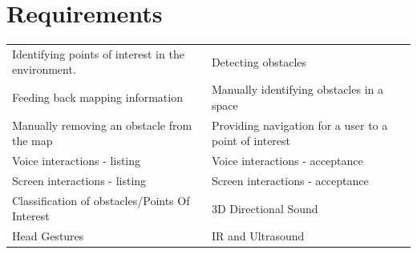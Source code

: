 \documentclass[prodmode,acmtosem]{acmsmall} %
\begin{document}
\section{Requirements}
\begin{center}
\begin{tabularx}{\textwidth}{| X | X |} 
 \hline
 \rowcolor{lightgray}
 \multicolumn{2}{|c|}{List of Requirements} \\ [0.5ex] 
 \hline\hline
 Identifying points of interest in the environment. &  Detecting obstacles \\
 \hline
 Feeding back mapping information &  Manually identifying obstacles in a space \\
 \hline
 Manually removing an obstacle from the map &  Providing navigation for a user to a point of interest \\ 
 \hline
 Voice interactions - listing &  Voice interactions - acceptance \\ 
 \hline
 Screen interactions - listing &  Screen interactions - acceptance \\ 
 \hline
 Classification of obstacles/Points Of Interest &  3D Directional Sound \\ 
 \hline
 Head Gestures &  IR and Ultrasound \\  
 \hline

 \hline
\end{tabularx}
\label{tab:requirements}
\end{center}
\end{document}
